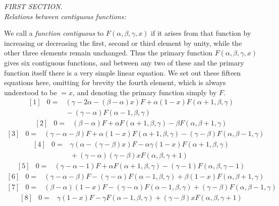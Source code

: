 \par{}
\begin{center}\textit{FIRST SECTION.}\\[4pt]
\textit{Relations between contiguous functions:}\end{center}
We call a \textit{function} \textit{contiguous} to $F(\alpha,\beta,\gamma,x)$ if it arises from that function by increasing or decreasing the first, second or third element by unity, while the other three elements remain unchanged. Thus the primary function $F(\alpha,\beta,\gamma,x)$ gives six contiguous functions, and between any two of these and the primary function itself there is a very simple linear equation. We set out these fifteen equations here, omitting for brevity the fourth element, which is always understood to be $=x$, and denoting the primary function simply by $F$.
\[
\begin{array}{rcl}
{[1]}&0=&(\gamma-2\alpha-(\beta-\alpha)x)F+\alpha(1-x)F(\alpha+1,\beta,\gamma)\\
&&{}-(\gamma-\alpha)F(\alpha-1,\beta,\gamma)
\end{array}
\]
\[
\begin{array}{rcl}
{[2]}&0=&(\beta-\alpha)F+\alpha F(\alpha+1,\beta,\gamma)-\beta F(\alpha,\beta+1,\gamma)
\end{array}
\]
\[
\begin{array}{rcl}
{[3]}&0=&(\gamma-\alpha-\beta)F+\alpha(1-x)F(\alpha+1,\beta,\gamma)-(\gamma-\beta)F(\alpha,\beta-1,\gamma)
\end{array}
\]
\[
\begin{array}{rcl}
{[4]}&0=&\gamma(\alpha-(\gamma-\beta)x)F-\alpha\gamma(1-x)F(\alpha+1,\beta,\gamma)\\
&&{}+(\gamma-\alpha)(\gamma-\beta)xF(\alpha,\beta,\gamma+1)
\end{array}
\]
\[
\begin{array}{rcl}
{[5]}&0=&(\gamma-\alpha-1)F+\alpha F(\alpha+1,\beta,\gamma)-(\gamma-1)F(\alpha,\beta,\gamma-1)
\end{array}
\]
\[
\begin{array}{rcl}
{[6]}&0=&(\gamma-\alpha-\beta)F-(\gamma-\alpha)F(\alpha-1,\beta,\gamma)+\beta(1-x)F(\alpha,\beta+1,\gamma)
\end{array}
\]
\[
\begin{array}{rcl}
{[7]}&0=&(\beta-\alpha)(1-x)F-(\gamma-\alpha)F(\alpha-1,\beta,\gamma)+(\gamma-\beta)F(\alpha,\beta-1,\gamma)
\end{array}
\]
\[
\begin{array}{rcl}
{[8]}&0=&\gamma(1-x)F-\gamma F(\alpha-1,\beta,\gamma)+(\gamma-\beta)xF(\alpha,\beta,\gamma+1)
\end{array}
\]
